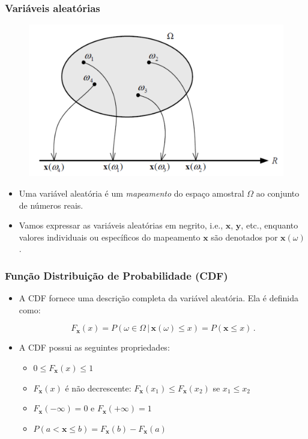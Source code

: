 \begin{frame}
    \frametitle{Variáveis aleatórias}
    
    \begin{figure}[t]
	  \begin{center}
	    \includegraphics[width=0.6\columnwidth]{figs/fig07}
	  \end{center}
	\end{figure}

    \begin{itemize}
     \item Uma variável aleatória é um \textit{mapeamento} do espaço amostral $\Omega$ ao conjunto de números reais.
      \item Vamos expressar as variáveis aleatórias em negrito, i.e., $\mathbf{x}$, $\mathbf{y}$, etc., enquanto valores individuais ou específicos do mapeamento $\mathbf{x}$ são denotados por $\mathbf{x}(\omega)$.
    \end{itemize}

\end{frame}

\begin{frame}
    \frametitle{Função Distribuição de Probabilidade (CDF)}
    
    \begin{itemize}
      \item A CDF fornece uma descrição completa da variável aleatória. Ela é definida como:

      \begin{equation}
	  F_{\mathbf{x}}(x) = P(\omega \in \Omega \, | \, \mathbf{x}(\omega) \leq x) = P(\mathbf{x} \leq x) \, .
      \end{equation}
      
      \item A CDF possui as seguintes propriedades:
      \begin{itemize}
       \item $0 \leq F_{\mathbf{x}}(x) \leq 1$
	\item $F_{\mathbf{x}}(x)$ é não decrescente: $F_{\mathbf{x}}(x_1) \leq F_{\mathbf{x}}(x_2)$ se $x_1 \leq x_2$
	\item $F_{\mathbf{x}}(-\infty) = 0$ e $F_{\mathbf{x}}(+\infty) = 1$
	\item $P(a < \mathbf{x} \leq b) = F_{\mathbf{x}}(b) - F_{\mathbf{x}}(a)$
      \end{itemize}
    
    \end{itemize}
\end{frame}

